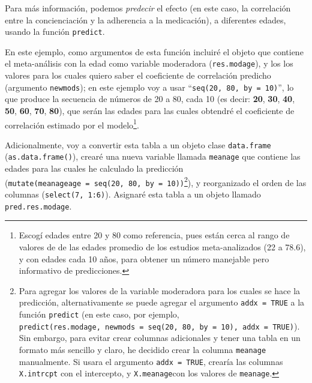 \documentclass[
  bookmarksnumbered]{article}
\begin{document}
Para más información, podemos \emph{predecir} el efecto (en este caso, la correlación entre la concienciación y la adherencia a la medicación), a diferentes edades, usando la función \texttt{predict}.

En este ejemplo, como argumentos de esta función incluiré el objeto que contiene el meta-análisis con la edad como variable moderadora (\texttt{res.modage}), y los los valores para los cuales quiero saber el coeficiente de correlación predicho (argumento \texttt{newmods}); en este ejemplo voy a usar ``\texttt{seq(20,\ 80,\ by\ =\ 10)}'', lo que produce la secuencia de números de 20 a 80, cada 10 (es decir: \textbf{20}, \textbf{30}, \textbf{40}, \textbf{50}, \textbf{60}, \textbf{70}, \textbf{80}), que serán las edades para las cuales obtendré el coeficiente de correlación estimado por el modelo\footnote{Escogí edades entre 20 y 80 como referencia, pues están cerca al rango de valores de de las edades promedio de los estudios meta-analizados (22 a 78.6), y con edades cada 10 años, para obtener un número manejable pero informativo de predicciones.}.

Adicionalmente, voy a convertir esta tabla a un objeto clase \texttt{data.frame} (\texttt{as.data.frame()}), crearé una nueva variable llamada \texttt{meanage} que contiene las edades para las cuales he calculado la predicción (\texttt{mutate(meanageage\ =\ seq(20,\ 80,\ by\ =\ 10))}\footnote{Para agregar los valores de la variable moderadora para los cuales se hace la predicción, alternativamente se puede agregar el argumento \texttt{addx\ =\ TRUE} a la función \texttt{predict} (en este caso, por ejemplo, \texttt{predict(res.modage,\ newmods\ =\ seq(20,\ 80,\ by\ =\ 10),\ addx\ =\ TRUE)}). Sin embargo, para evitar crear columnas adicionales y tener una tabla en un formato más sencillo y claro, he decidido crear la columna \texttt{meanage} manualmente. Si usara el argumento \texttt{addx\ =\ TRUE}, crearía las columnas \texttt{X.intrcpt} con el intercepto, y \texttt{X.meanage}con los valores de \texttt{meanage}.}), y reorganizado el orden de las columnas (\texttt{select(7,\ 1:6)}). Asignaré esta tabla a un objeto llamado \texttt{pred.res.modage}.
\end{document}
